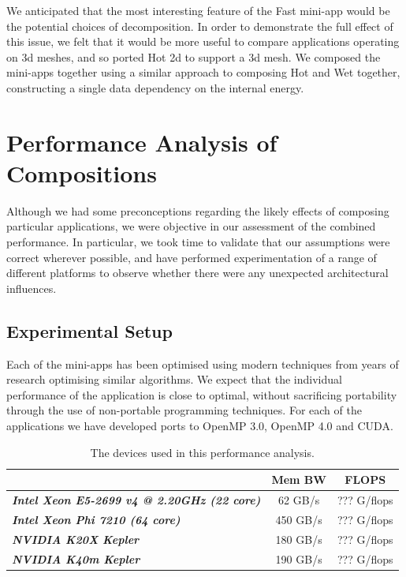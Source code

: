 \documentclass[runningheads,a4paper]{llncs}
\begin{document}
We anticipated that the most interesting feature of the Fast mini-app would be the potential choices of decomposition. In order to demonstrate the full effect of this issue, we felt that it would be more useful to compare applications operating on 3d meshes, and so ported Hot 2d to support a 3d mesh. We composed the mini-apps together using a similar approach to composing Hot and Wet together, constructing a single data dependency on the internal energy.

\section{Performance Analysis of Compositions}

Although we had some preconceptions regarding the likely effects of composing particular applications, we were objective in our assessment of the combined performance. In particular, we took time to validate that our assumptions were correct wherever possible, and have performed experimentation of a range of different platforms to observe whether there were any unexpected architectural influences.

\subsection{Experimental Setup}

Each of the mini-apps has been optimised using modern techniques from years of research optimising similar algorithms. We expect that the individual performance of the application is close to optimal, without sacrificing portability through the use of non-portable programming techniques. For each of the applications we have developed ports to OpenMP 3.0, OpenMP 4.0 and CUDA.

\begin{table}[h]
  \begin{center}
    \begin{tabular}{l|c|c}
      \hline
      \textbf{} & \textbf{Mem BW} & \textbf{FLOPS}  \\
      \hline
      \textit{\textbf{Intel Xeon E5-2699 v4 @ 2.20GHz (22 core)}} & 62 GB/s & ??? G/flops \\
      \textit{\textbf{Intel Xeon Phi 7210 (64 core)}} & 450 GB/s & ??? G/flops \\
      \textit{\textbf{NVIDIA K20X Kepler}} & 180 GB/s & ??? G/flops \\
      \textit{\textbf{NVIDIA K40m Kepler}} & 190 GB/s & ??? G/flops \\
    \end{tabular}
  \end{center}
  \caption{The devices used in this performance analysis.}
  \label{tab:hardware}
\end{table}
\end{document}
